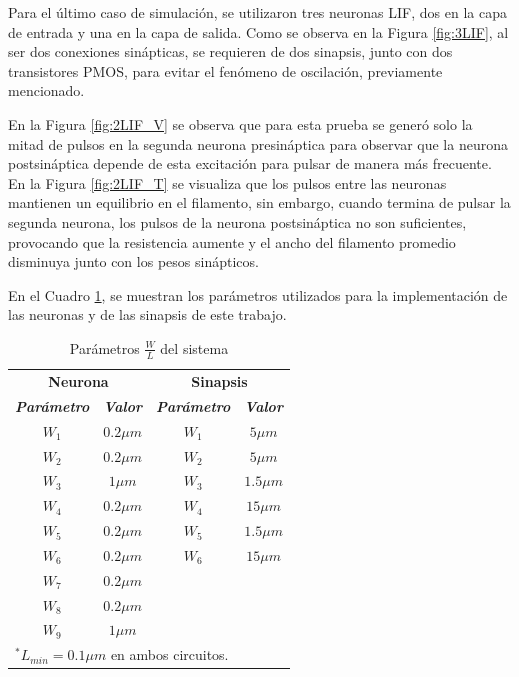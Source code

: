 \documentclass[conference]{IEEEtran}
\begin{document}
Para el último caso de simulación, se utilizaron tres neuronas LIF, dos en la capa de entrada y una en la capa de salida. Como se observa en la Figura \ref{fig:3LIF}, al ser dos conexiones sinápticas, se requieren de dos sinapsis, junto con dos transistores PMOS, para evitar el fenómeno de oscilación, previamente mencionado.

En la Figura \ref{fig:2LIF_V} se observa que para esta prueba se generó solo la mitad de pulsos en la segunda neurona presináptica para observar que la neurona postsináptica depende de esta excitación para pulsar de manera más frecuente. En la Figura \ref{fig:2LIF_T} se visualiza que los pulsos entre las neuronas mantienen un equilibrio en el filamento, sin embargo, cuando termina de pulsar la segunda neurona, los pulsos de la neurona postsináptica no son suficientes, provocando que la resistencia aumente y el ancho del filamento promedio disminuya junto con los pesos sinápticos.

En el Cuadro \ref{parametros}, se muestran los parámetros utilizados para la implementación de las neuronas y de las sinapsis de este trabajo.

\begin{table}[htbp]
\caption{Parámetros $\frac{W}{L}$ del sistema}
\begin{center}
\begin{tabular}{|c|c|c|c|}
\hline
\multicolumn{2}{|c|}{\textbf{Neurona}}&\multicolumn{2}{|c|}{\textbf{Sinapsis}} \\
\cline{1-4} 
\textbf{\textit{Parámetro}} & \textbf{\textit{Valor}}& \textbf{\textit{Parámetro}}& \textbf{\textit{Valor}} \\
\hline
$W_{1}$ & $0.2\mu m$ & $W_{1}$ & $5\mu m$\\
\hline
$W_{2}$ & $0.2\mu m$ & $W_{2}$ & $5\mu m$\\
\hline
$W_{3}$ & $1\mu m$ & $W_{3}$ & $1.5\mu m$\\
\hline
$W_{4}$ & $0.2\mu m$ & $W_{4}$ & $15\mu m$\\
\hline
$W_{5}$ & $0.2\mu m$ & $W_{5}$ & $1.5\mu m$\\
\hline
$W_{6}$ & $0.2\mu m$ & $W_{6}$ & $15\mu m$\\
\hline
$W_{7}$ & $0.2\mu m$ & & \\
\hline
$W_{8}$ & $0.2\mu m$ & & \\
\hline
$W_{9}$ & $1\mu m$ & & \\
\hline
\multicolumn{4}{l}{$^{*}$$L_{min}=0.1\mu m$ en ambos circuitos.}
\end{tabular}
\label{parametros}
\end{center}
\end{table}
\end{document}
